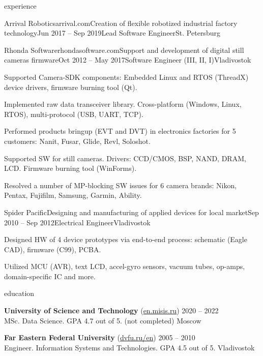 \documentclass{Vladimir.Ivanov.CV}
\begin{document}
\begin{rSection}{experience}
\begin{rCompany}{Arrival Robotics}{arrival.com}{Creation of flexible robotized industrial factory technology}{Jun 2017 -- Sep 2019}{Lead Software Engineer}{St. Petersburg}
\end{rCompany}
\begin{rCompany}{Rhonda Software}{rhondasoftware.com}{Support and development of digital still cameras firmware}{Oct 2012 -- May 2017}{Software Engineer (III, II, I)}{Vladivostok}

\item Supported Camera-SDK components: Embedded Linux and RTOS (ThreadX) device drivers, firmware burning tool (Qt).
\item Implemented raw data transceiver library. Cross-platform (Windows, Linux, RTOS), multi-protocol (USB, UART, TCP).
\item Performed products bringup (EVT and DVT) in electronics factories for 5 customers: Nanit, Fusar, Glide, Revl, Soloshot.
\item Supported SW for still cameras. Drivers: CCD/CMOS, BSP, NAND, DRAM, LCD. Firmware burning tool (WinForms).
\item Resolved a number of MP-blocking SW issues for 6 camera brands: Nikon, Pentax, Fujifilm, Samsung, Garmin, Ability.

\end{rCompany}
\begin{rCompany}{Spider Pacific}{}{Designing and manufacturing of applied devices for local market}{Sep 2010 -- Sep 2012}{Electrical Engineer}{Vladivostok}

\item Designed HW of 4 device prototypes via end-to-end process: schematic (Eagle CAD), firmware (C99), PCBA.
\item Utilized MCU (AVR), text LCD, accel-gyro sensors, vacuum tubes, op-amps, domain-specific IC and more.

\end{rCompany}
\end{rSection}

\begin{rSection}{education}

{\bf University of Science and Technology } {(\href{https://en.misis.ru}{en.misis.ru})} \hfill {2020 -- 2022} \\
MSc. Data Science. GPA 4.7 out of 5. (not completed) \hfill {Moscow}

{\bf Far Eastern Federal University} {(\href{https://www.dvfu.ru/en}{dvfu.ru/en})} \hfill {2005 -- 2010} \\
Engineer. Information Systems and Technologies. GPA 4.5 out of 5. \hfill {Vladivostok}

\end{rSection}
\end{document}
